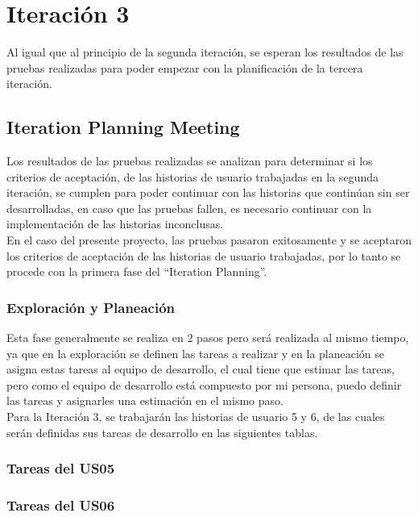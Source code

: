 \chapter{Iteración 3}
\label{chap:iteracion_3}

Al igual que al principio de la segunda iteración, se esperan los resultados de las pruebas realizadas para poder empezar con la planificación de la tercera iteración.

\section{Iteration Planning Meeting}
\label{sec:iteration2_planning_meeting}


Los resultados de las pruebas realizadas se analizan para determinar si los criterios de aceptación, de las historias de usuario trabajadas en la segunda iteración, se cumplen para poder continuar con las historias que continúan sin ser desarrolladas, en caso que las pruebas fallen, es necesario continuar con la implementación de las historias inconclusas.\\

En el caso del presente proyecto, las pruebas pasaron exitosamente y se aceptaron los criterios de aceptación de las historias de usuario trabajadas, por lo tanto se procede con la primera fase del “Iteration Planning”. \\


\subsection{Exploración y Planeación}
\label{sub:iteration2_exploracion_planeacion}

Esta fase generalmente se realiza en 2 pasos pero será realizada al mismo tiempo, ya que en la exploración se definen las tareas a realizar y en la planeación se asigna estas tareas al equipo de desarrollo, el cual tiene que estimar las tareas, pero como el equipo de desarrollo está compuesto por mi persona, puedo definir las tareas y asignarles una estimación en el mismo paso.\\

Para la Iteración 3, se trabajarán las historias de usuario 5 y 6, de las cuales serán definidas sus tareas de desarrollo en las siguientes tablas.


\subsection{Tareas del US05}
\label{sub:us05_tasks}

  

\subsection{Tareas del US06}
\label{sub:us06_tasks}

  
